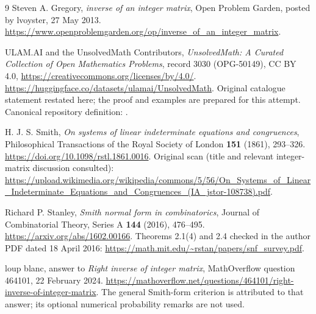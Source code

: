\documentclass[11pt]{article}
\begin{document}
\begin{thebibliography}{9}
Steven A. Gregory, \emph{inverse of an integer matrix},
Open Problem Garden, posted by lvoyster, 27 May 2013.
\url{https://www.openproblemgarden.org/op/inverse_of_an_integer_matrix}.

ULAM.AI and the UnsolvedMath Contributors,
\emph{UnsolvedMath: A Curated Collection of Open Mathematics Problems},
record 3030 (OPG-50149), CC BY 4.0,
\url{https://creativecommons.org/licenses/by/4.0/}.
\url{https://huggingface.co/datasets/ulamai/UnsolvedMath}.
Original catalogue statement restated here; the proof and examples are
prepared for this attempt. Canonical repository definition:
.

H. J. S. Smith, \emph{On systems of linear indeterminate equations and
congruences}, Philosophical Transactions of the Royal Society of
London \textbf{151} (1861), 293--326.
\url{https://doi.org/10.1098/rstl.1861.0016}.
Original scan (title and relevant integer-matrix discussion consulted):
\url{https://upload.wikimedia.org/wikipedia/commons/5/56/On_Systems_of_Linear_Indeterminate_Equations_and_Congruences_(IA_jstor-108738).pdf}.

Richard P. Stanley, \emph{Smith normal form in combinatorics},
Journal of Combinatorial Theory, Series A \textbf{144} (2016), 476--495.
\url{https://arxiv.org/abs/1602.00166}.
Theorems 2.1(4) and 2.4 checked in the author PDF dated 18 April 2016:
\url{https://math.mit.edu/~rstan/papers/snf_survey.pdf}.

loup blanc, answer to \emph{Right inverse of integer matrix},
MathOverflow question 464101, 22 February 2024.
\url{https://mathoverflow.net/questions/464101/right-inverse-of-integer-matrix}.
The general Smith-form criterion is attributed to that answer;
its optional numerical probability remarks are not used.
\end{thebibliography}
\end{document}
